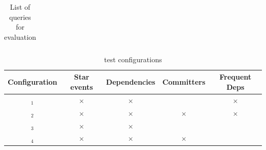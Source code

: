 \begin{table}[!h]
\begin{tabular}{|p{0.80cm}|p{6.0cm}|p{0.80cm}|p{6.0cm}|}
	\end{tabular}
	\caption[List of queries]{List of queries for evaluation}
	\label{tab:Queries}
\end{table}



%
%



\begin{table}[h!]
	\small
	\centering
	\begin{tabular}{|c|c|c|c|c|}  \hline		
		{\bf Configuration} & {\bf Star events} & {\bf Dependencies} & {\bf Committers} & {\bf Frequent Deps} \\  \hline		
		\CrossSimA$_{1}$ & $\times$ & $\times$ &  & $\times$ \\  \hline
		\CrossSimA$_{2}$ & $\times$ & $\times$ & $\times$ & $\times$ \\  \hline
		\CrossSimA$_{3}$ & $\times$ & $\times$ &  & \\  \hline
		\CrossSimA$_{4}$ & $\times$ & $\times$ & $\times$ & \\  \hline		
	\end{tabular}
	\caption[\CrossSim test configurations]{\CrossSim test configurations}
	\label{tab:TestConfigurations}
\end{table}

